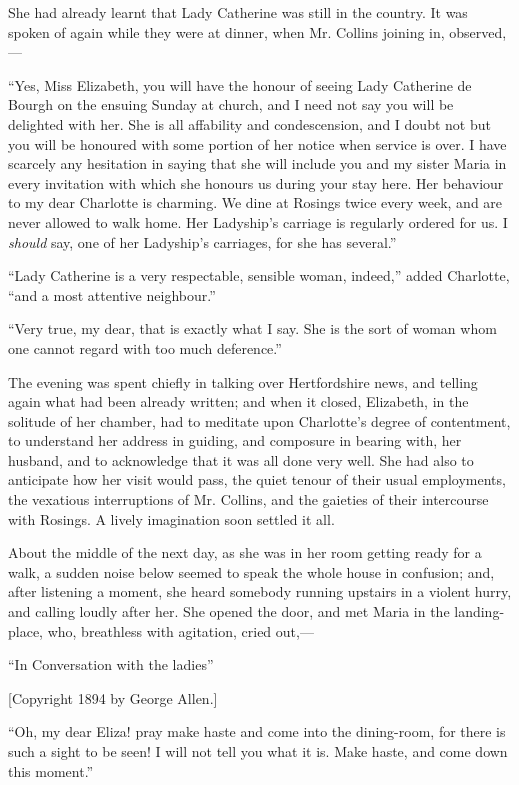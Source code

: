 \documentclass[12pt,openright]{book}
\begin{document}
She had already learnt that Lady Catherine was still in the country. It was spoken of again while they were at dinner, when Mr. Collins joining in, observed,—

“Yes, Miss Elizabeth, you will have the honour of seeing Lady Catherine de Bourgh on the ensuing Sunday at church, and I need not say you will be delighted with her. She is all affability and condescension, and I doubt not but you will be honoured with some portion of her notice when service is over. I have scarcely any hesitation in saying that she will include you and my sister Maria in every invitation with which she honours us during your stay here. Her behaviour to my dear Charlotte is charming. We dine at Rosings twice every week, and are never allowed to walk home. Her Ladyship’s carriage is regularly ordered for us. I \textit{should} say, one of her Ladyship’s carriages, for she has several.”

“Lady Catherine is a very respectable, sensible woman, indeed,” added Charlotte, “and a most attentive neighbour.”

“Very true, my dear, that is exactly what I say. She is the sort of woman whom one cannot regard with too much deference.”

The evening was spent chiefly in talking over Hertfordshire news, and telling again what had been already written; and when it closed, Elizabeth, in the solitude of her chamber, had to meditate upon Charlotte’s degree of contentment, to understand her address in guiding, and composure in bearing with, her husband, and to acknowledge that it was all done very well. She had also to anticipate how her visit would pass, the quiet tenour of their usual employments, the vexatious interruptions of Mr. Collins, and the gaieties of their intercourse with Rosings. A lively imagination soon settled it all.

About the middle of the next day, as she was in her room getting ready for a walk, a sudden noise below seemed to speak the whole house in confusion; and, after listening a moment, she heard somebody running upstairs in a violent hurry, and calling loudly after her. She opened the door, and met Maria in the landing-place, who, breathless with agitation, cried out,—

“In Conversation with the ladies”

[Copyright 1894 by George Allen.]

“Oh, my dear Eliza! pray make haste and come into the dining-room, for there is such a sight to be seen! I will not tell you what it is. Make haste, and come down this moment.”
\end{document}
